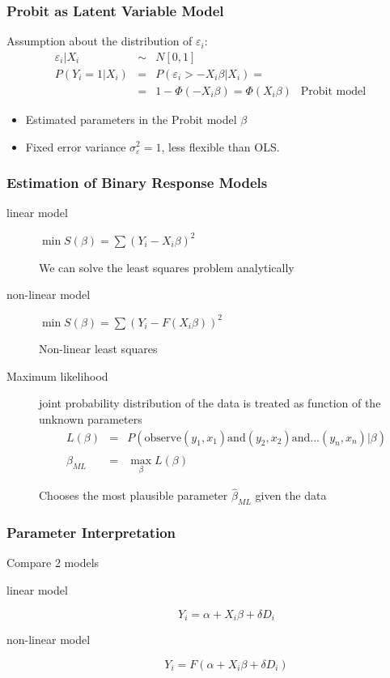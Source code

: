 \documentclass[pdftex]{beamer}
\begin{document}
  \begin{frame}
\frametitle{Probit as Latent Variable Model}

Assumption about the distribution of $\varepsilon_i$:
\begin{eqnarray*}
  \varepsilon_i|X_i &\sim& N[0,1]\\
  P(Y_i=1|X_i) &=& P( \varepsilon_i > - X_i \beta  | X_i) = \\
  &=& 1- \Phi ( -X_i \beta ) =\Phi ( X_i \beta ) \;\;\ \text{Probit model}
\end{eqnarray*}

\begin{itemize}
  \item Estimated parameters in the Probit model $\beta$
  \item Fixed error variance $\sigma^2_{\varepsilon}=1$, less flexible than OLS.
\end{itemize}

\end{frame}

  \begin{frame}
\frametitle{Estimation of Binary Response Models}


\begin{description}
  \item[linear model] $\min S(\beta) = \sum (Y_i-X_i \beta)^2$

  We can solve the least squares problem analytically
  \item[non-linear model] $\min S(\beta) = \sum (Y_i-F(X_i \beta))^2$

  Non-linear least squares
    \item[Maximum likelihood] joint probability distribution of the data is treated as function of the unknown parameters
 \begin{eqnarray*}
  L(\beta) &=& P(\text{observe} (y_1,x_1)\text{and} (y_2,x_2) \text{and} ...(y_n,x_n)|\beta) \\
  \hat{\beta}_{ML} &=& \max_{\beta} L(\beta)
  \end{eqnarray*}   

  Chooses the most plausible parameter $\hat{\beta}_{ML}$ given the data
\end{description}
\end{frame}

  \begin{frame}
\frametitle{Parameter Interpretation}

Compare 2 models
\begin{description}
  \item[linear model]
  \[ Y_i = \alpha + X_i \beta + \delta D_i \]

  \item[non-linear model]
   \[ Y_i = F(\alpha + X_i \beta + \delta D_i) \]

\end{description}
\end{frame}
\end{document}
